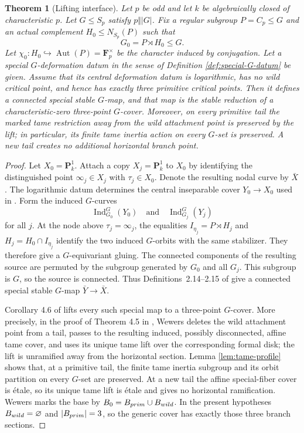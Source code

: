 \documentclass[10pt,a4paper]{amsart}
\newtheorem{theorem}{Theorem}[section]
\numberwithin{equation}{section}
\begin{document}
\begin{theorem}[Lifting interface]\label{prop:interface}
Let $p$ be odd and let $k$ be algebraically closed of characteristic $p$.
Let $G\leq S_p$ satisfy $p\Vert |G|$.  Fix a regular subgroup
$P=C_p\leq G$ and an actual complement $H_0\leq N_{S_p}(P)$ such that
\[
 G_0=P\rtimes H_0\leq G.
\]
Let $\chi_0:H_0\hookrightarrow\operatorname{Aut}(P)
=\mathbf F_p^\times$ be the character induced by conjugation.
Let a special $G$-deformation datum in the sense of Definition
\ref{def:special-G-datum} be given.  Assume that its central deformation
datum is logarithmic, has no wild critical point, and hence has exactly
three primitive critical points.  Then it defines a connected special
stable $G$-map, and that map is
the stable reduction of a characteristic-zero three-point $G$-cover.
Moreover, on every primitive tail the marked tame restriction away from the
wild attachment point is preserved by the lift; in particular, its finite
tame inertia action on every $G$-set is preserved.  A new tail creates no
additional horizontal branch point.
\end{theorem}

\begin{proof}
Let $X_0=\mathbf P^1_k$.  Attach a copy $X_j=\mathbf P^1_k$ to $X_0$ by
identifying the distinguished point $\infty_j\in X_j$ with
$\tau_j\in X_0$.  Denote the resulting nodal curve by $\bar X$.  The
logarithmic datum determines the central inseparable cover $Y_0\to X_0$
used in \cite[Definitions~2.14--2.15]{WewersThree}.  Form the induced
$G$-curves
\[
 \operatorname{Ind}_{G_0}^{G}(Y_0)
 \quad\text{and}\quad
 \operatorname{Ind}_{G_j}^{G}(Y_j)
\]
for all $j$.  At the node above $\tau_j=\infty_j$, the equalities
$I_{\eta_j}=P\rtimes H_j$ and $H_j=H_0\cap I_{\eta_j}$ identify the two
induced $G$-orbits with the same stabilizer.  They therefore give a
$G$-equivariant gluing.  The connected components of the resulting source
are permuted by the subgroup generated by $G_0$ and all $G_j$.  This subgroup
is $G$, so the source is connected.  Thus Definitions~2.14--2.15 of
\cite{WewersThree} give a connected special stable $G$-map
$\bar Y\to\bar X$.

Corollary 4.6 of \cite{WewersThree} lifts every such special map to a
three-point $G$-cover.  More precisely, in the proof of Theorem 4.5 in
\cite[Section 4.2.3]{WewersThree}, Wewers deletes the wild attachment point
from a tail, passes to the resulting induced, possibly disconnected, affine
tame cover, and uses its unique tame lift over the corresponding formal disk;
the lift is unramified away from the horizontal section.  Lemma
\ref{lem:tame-profile} shows that, at a primitive tail, the finite tame
inertia subgroup and its orbit partition on every $G$-set are preserved.  At
a new tail the affine special-fiber cover is \'etale, so its unique tame lift
is \'etale and gives no horizontal ramification.
Wewers marks the base by $B_0=B_{\rm prim}\cup B_{\rm wild}$.  In the
present hypotheses $B_{\rm wild}=\varnothing$ and $|B_{\rm prim}|=3$, so the
generic cover has exactly those three branch sections.
\end{proof}
\end{document}
